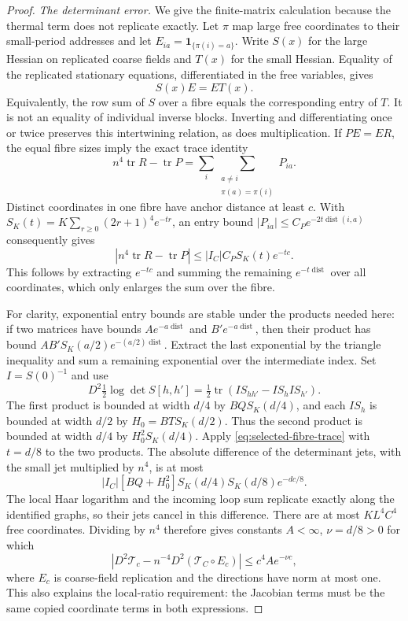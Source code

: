 \begin{proof}
\emph{The determinant error.} We give the finite-matrix calculation
because the thermal term does not replicate exactly. Let $\pi$ map
large free coordinates to their small-period addresses and let
$E_{ia}=\mathbf1_{\{\pi(i)=a\}}$. Write $S(x)$ for the large Hessian
on replicated coarse fields and $T(x)$ for the small Hessian. Equality
of the replicated stationary equations, differentiated in the free
variables, gives
\[
                    S(x)E=ET(x).
\]
Equivalently, the row sum of $S$ over a fibre equals the corresponding
entry of $T$. It is not an equality of individual inverse blocks.
Inverting and differentiating once or twice preserves this intertwining
relation, as does multiplication. If $PE=ER$, the equal fibre sizes
imply the exact trace identity
\begin{equation}\label{eq:selected-fibre-trace}
 n^4\operatorname{tr}R-\operatorname{tr}P
   =\sum_i\sum_{\substack{a\ne i\\\pi(a)=\pi(i)}}P_{ia}.
\end{equation}
Distinct coordinates in one fibre have anchor distance at least $c$.
With $S_K(t)=K\sum_{r\ge0}(2r+1)^4e^{-tr}$, an entry bound
$|P_{ia}|\le C_Pe^{-2t\operatorname{dist}(i,a)}$ consequently gives
\[
 |n^4\operatorname{tr}R-\operatorname{tr}P|
       \le |I_C|C_PS_K(t)e^{-tc}.
\]
This follows by extracting $e^{-tc}$ and summing the remaining
$e^{-t\operatorname{dist}}$ over all coordinates, which only enlarges
the sum over the fibre.

For clarity, exponential entry bounds are stable under the products
needed here: if two matrices have bounds $A e^{-a\operatorname{dist}}$
and $B'e^{-a\operatorname{dist}}$, then their product has bound
$AB'S_K(a/2)e^{-(a/2)\operatorname{dist}}$. Extract the last exponential
by the triangle inequality and sum a remaining exponential over the
intermediate index. Set $I=S(0)^{-1}$ and use
\[
 D^2\tfrac12\log\det S[h,h']
   =\tfrac12\operatorname{tr}(I S_{hh'}-I S_h I S_{h'}).
\]
The first product is bounded at width $d/4$ by
$BQ S_K(d/4)$, and each $I S_h$ is bounded at width $d/2$ by
$H_0=BT S_K(d/2)$. Thus the second product is bounded at width $d/4$
by $H_0^2 S_K(d/4)$. Apply \eqref{eq:selected-fibre-trace} with
$t=d/8$ to the two products. The absolute difference of the determinant
jets, with the small jet multiplied by $n^4$, is at most
\[
 |I_C|[BQ+H_0^2]S_K(d/4)S_K(d/8)e^{-dc/8}.
\]
The local Haar logarithm and the incoming loop sum replicate exactly
along the identified graphs, so their jets cancel in this difference.
There are at most $K L^4 C^4$ free coordinates. Dividing by $n^4$
therefore gives constants $A<\infty$, $\nu=d/8>0$ for which
\[
 |D^2\mathcal T_c-n^{-4}D^2(\mathcal T_C\circ E_c)|
        \le c^4 A e^{-\nu c},
\]
where $E_c$ is coarse-field replication and the directions have norm
at most one. This also explains the local-ratio requirement: the
Jacobian terms must be the same copied coordinate terms in both
expressions.


\end{proof}
